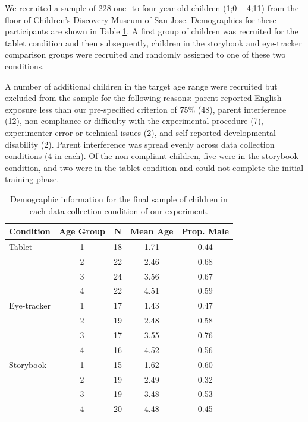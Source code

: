 \documentclass[man,noapacite]{apa2}
\begin{document}
We recruited a sample of 228 one- to four-year-old children (1;0 -- 4;11) from the floor of Children's Discovery Museum of San Jose. Demographics for these participants are shown in Table \ref{tab:demo}. A first group of children was recruited for the tablet condition and then subsequently, children in the storybook and eye-tracker comparison groups were recruited and randomly assigned to one of these two conditions.

A number of additional children in the target age range were recruited but excluded from the sample for the following reasons: parent-reported English exposure less than our pre-specified criterion of 75\% (48), parent interference (12), non-compliance or difficulty with the experimental procedure (7), experimenter error or technical issues (2), and self-reported developmental disability (2). Parent interference was spread evenly across data collection conditions (4 in each). Of the non-compliant children, five were in the storybook condition, and two were in the tablet condition and could not complete the initial training phase.  

\begin{table}[ht]
\centering
\caption{\label{tab:demo} Demographic information for the final sample of children in each data collection condition of our experiment.}
\begin{tabular}{lcccc}
  \hline
 Condition & Age Group & N & Mean Age & Prop. Male \\ 
  \hline
Tablet  & 1 &  18 & 1.71 & 0.44 \\ 
           & 2 &  22 & 2.46 & 0.68 \\ 
           & 3 &  24 & 3.56 & 0.67 \\ 
           & 4 &  22 & 4.51 & 0.59 \\  
Eye-tracker & 1 &  17 & 1.43 & 0.47 \\ 
           & 2 &  19 & 2.48 & 0.58 \\ 
           & 3 &  17 & 3.55 & 0.76 \\ 
           & 4 &  16 & 4.52 & 0.56 \\ 
Storybook & 1 &  15 & 1.62 & 0.60 \\ 
           & 2 &  19 & 2.49 & 0.32 \\ 
           & 3 &  19 & 3.48 & 0.53 \\ 
           & 4 &  20 & 4.48 & 0.45 \\ 
   \hline
\end{tabular}
\end{table}
\end{document}
